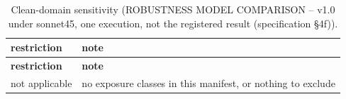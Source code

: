 \begingroup\footnotesize
\begin{longtable}{>{\raggedright\arraybackslash}p{126.4pt}>{\raggedright\arraybackslash}p{304.6pt}}
\caption{Clean-domain sensitivity (ROBUSTNESS MODEL COMPARISON -- v1.0 under sonnet45, one execution, not the registered result (specification §4f)).} \\
\toprule
\textbf{restriction} & \textbf{note} \\
\midrule
\endfirsthead
\toprule
\textbf{restriction} & \textbf{note} \\
\midrule
\endhead
\bottomrule
\endfoot
not applicable & no exposure classes in this manifest, or nothing to exclude \\
\end{longtable}
\endgroup

